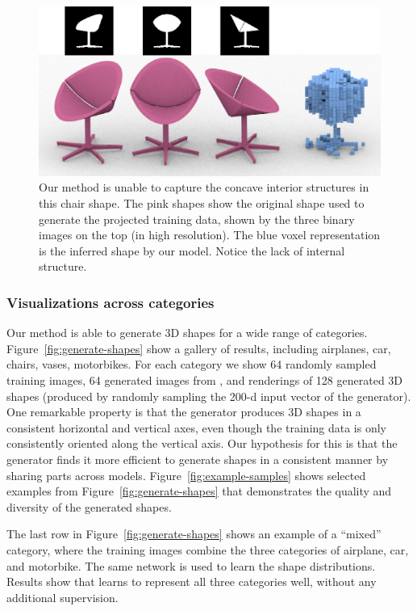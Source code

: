 \begin{figure}[t]
\centering
\includegraphics[width=0.9\linewidth]{fig/failure.png}
\caption{\label{fig:failure} Our method is unable to capture the concave interior structures in this chair shape. The pink shapes show the original shape used to generate the projected training data, shown by the three binary images on the top (in high resolution). The blue voxel representation is the inferred shape by our model. Notice the lack of internal structure.}
\end{figure}

\subsubsection{Visualizations across categories} 
Our method is able to generate 3D shapes for a wide range of
categories. 
Figure~\ref{fig:generate-shapes} show a gallery of results,
including airplanes, car, chairs, vases, motorbikes. For each category
we show 64 randomly sampled training images, 64 generated images from
\prgan, and renderings of 128 generated 3D shapes (produced by randomly
sampling the 200-d input vector of the generator). 
One remarkable property is that the generator produces 3D shapes in a
consistent horizontal and vertical axes, even though the training data
is only consistently oriented along the vertical axis. Our hypothesis
for this is that the generator finds it more efficient to generate
shapes in a consistent manner by sharing parts across
models. Figure~\ref{fig:example-samples} shows selected examples from
Figure~\ref{fig:generate-shapes} that demonstrates the quality and
diversity of the generated shapes. 

The last row in Figure~\ref{fig:generate-shapes} shows an example of a
``mixed'' category, where the training images combine the three
categories of airplane, car, and motorbike. The same \prgan network is
used to learn the shape distributions. Results show that \prgan learns
to represent all three categories well, without any additional
supervision.


